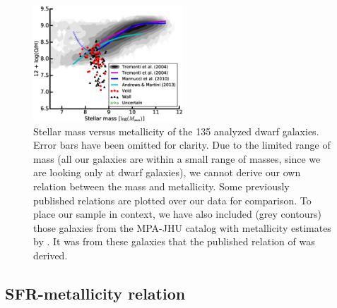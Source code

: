 \begin{figure}
    \centering
    \includegraphics[width=0.5\textwidth]{Images/Paper1/MZ_1sig_I06_dwarf_SF_t3_python}
    \caption[Stellar mass versus metallicity for 135 dwarf galaxy sample]
    {Stellar mass versus metallicity of the 135 analyzed dwarf galaxies.  Error 
    bars have been omitted for clarity.  Due to the limited range of mass (all 
    our galaxies are within a small range of masses, since we are looking only 
    at dwarf galaxies), we cannot derive our own relation between the mass and 
    metallicity.  Some previously published relations are plotted over our data 
    for comparison.  To place our sample in context, we have also included (grey 
    contours) those galaxies from the MPA-JHU catalog with metallicity estimates 
    by \cite{Tremonti04}.  It was from these galaxies that the published 
    relation of \cite{Tremonti04} was derived.}
    \label{fig:MZrelation}
\end{figure}



\subsection{SFR-metallicity relation}

